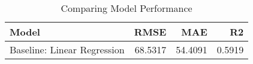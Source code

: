 \begin{table}
\centering
\caption{Comparing Model Performance}
\begin{tabular}{lrrr}
\toprule
                      Model &    RMSE &     MAE &     R2 \\
\midrule
Baseline: Linear Regression & 68.5317 & 54.4091 & 0.5919 \\
\bottomrule
\end{tabular}
\end{table}
